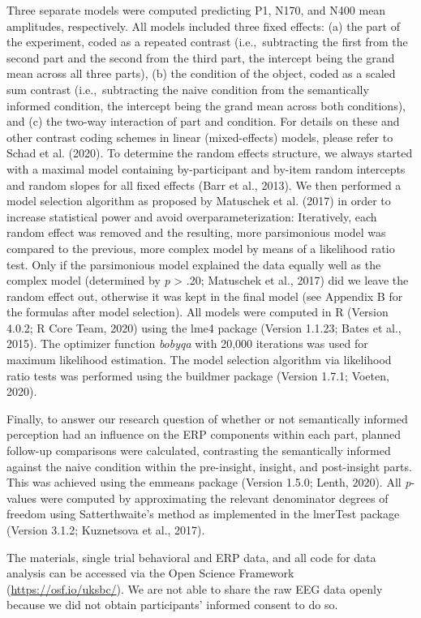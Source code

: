 \documentclass[
  english,
  doc,12pt,twoside,floatsintext]{apa7}
\begin{document}
Three separate models were computed predicting P1, N170, and N400 mean amplitudes, respectively. All models included three fixed effects: (a) the part of the experiment, coded as a repeated contrast (i.e.,~subtracting the first from the second part and the second from the third part, the intercept being the grand mean across all three parts), (b) the condition of the object, coded as a scaled sum contrast (i.e.,~subtracting the naive condition from the semantically informed condition, the intercept being the grand mean across both conditions), and (c) the two-way interaction of part and condition. For details on these and other contrast coding schemes in linear (mixed-effects) models, please refer to Schad et al. (2020). To determine the random effects structure, we always started with a maximal model containing by-participant and by-item random intercepts and random slopes for all fixed effects (Barr et al., 2013). We then performed a model selection algorithm as proposed by Matuschek et al. (2017) in order to increase statistical power and avoid overparameterization: Iteratively, each random effect was removed and the resulting, more parsimonious model was compared to the previous, more complex model by means of a likelihood ratio test. Only if the parsimonious model explained the data equally well as the complex model (determined by \emph{p} \textgreater{} .20; Matuschek et al., 2017) did we leave the random effect out, otherwise it was kept in the final model (see Appendix B for the formulas after model selection). All models were computed in R (Version 4.0.2; R Core Team, 2020) using the lme4 package (Version 1.1.23; Bates et al., 2015). The optimizer function \emph{bobyqa} with 20,000 iterations was used for maximum likelihood estimation. The model selection algorithm via likelihood ratio tests was performed using the buildmer package (Version 1.7.1; Voeten, 2020).

Finally, to answer our research question of whether or not semantically informed perception had an influence on the ERP components within each part, planned follow-up comparisons were calculated, contrasting the semantically informed against the naive condition within the pre-insight, \mbox{insight}, and post-insight parts. This was achieved using the emmeans package (Version 1.5.0; Lenth, 2020). All \emph{p}-values were computed by approximating the relevant denominator degrees of freedom using Satterthwaite's method as implemented in the lmerTest package (Version 3.1.2; Kuznetsova et al., 2017).

The materials, single trial behavioral and ERP data, and all code for data analysis can be accessed via the Open Science Framework (\url{https://osf.io/uksbc/}). We are not able to share the raw EEG data openly because we did not obtain participants' informed consent to do so.
\end{document}
